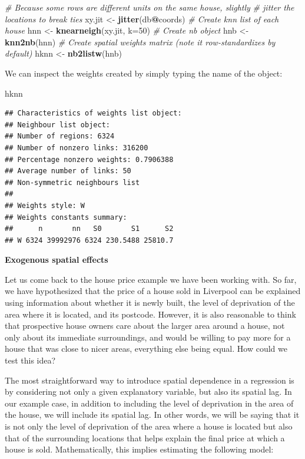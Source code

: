 \documentclass[
]{book}
\newenvironment{Shaded}{\begin{snugshade}}{\end{snugshade}}
\newcommand{\CommentTok}[1]{\textcolor[rgb]{0.56,0.35,0.01}{\textit{#1}}}
\newcommand{\DataTypeTok}[1]{\textcolor[rgb]{0.13,0.29,0.53}{#1}}
\newcommand{\DecValTok}[1]{\textcolor[rgb]{0.00,0.00,0.81}{#1}}
\newcommand{\KeywordTok}[1]{\textcolor[rgb]{0.13,0.29,0.53}{\textbf{#1}}}
\newcommand{\NormalTok}[1]{#1}
\newcommand{\OperatorTok}[1]{\textcolor[rgb]{0.81,0.36,0.00}{\textbf{#1}}}
\newcommand{\StringTok}[1]{\textcolor[rgb]{0.31,0.60,0.02}{#1}}
\begin{document}
\begin{Shaded}
\begin{Highlighting}[]
\CommentTok{# Because some rows are different units on the same house, slightly}
\CommentTok{# jitter the locations to break ties}
\NormalTok{xy.jit <-}\StringTok{ }\KeywordTok{jitter}\NormalTok{(db}\OperatorTok{@}\NormalTok{coords)}
\CommentTok{# Create knn list of each house}
\NormalTok{hnn <-}\StringTok{ }\KeywordTok{knearneigh}\NormalTok{(xy.jit, }\DataTypeTok{k=}\DecValTok{50}\NormalTok{)}
\CommentTok{# Create nb object}
\NormalTok{hnb <-}\StringTok{ }\KeywordTok{knn2nb}\NormalTok{(hnn)}
\CommentTok{# Create spatial weights matrix (note it row-standardizes by default)}
\NormalTok{hknn <-}\StringTok{ }\KeywordTok{nb2listw}\NormalTok{(hnb)}
\end{Highlighting}
\end{Shaded}

We can inspect the weights created by simply typing the name of the object:

\begin{Shaded}
\begin{Highlighting}[]
\NormalTok{hknn}
\end{Highlighting}
\end{Shaded}

\begin{verbatim}
## Characteristics of weights list object:
## Neighbour list object:
## Number of regions: 6324 
## Number of nonzero links: 316200 
## Percentage nonzero weights: 0.7906388 
## Average number of links: 50 
## Non-symmetric neighbours list
## 
## Weights style: W 
## Weights constants summary:
##      n       nn   S0       S1      S2
## W 6324 39992976 6324 230.5488 25810.7
\end{verbatim}

\textbf{Exogenous spatial effects}

Let us come back to the house price example we have been working with. So far, we have hypothesized that the price of a house sold in Liverpool can be explained using information about whether it is newly built, the level of deprivation of the area where it is located, and its postcode. However, it is also reasonable to think that prospective house owners care about the larger area around a house, not only about its immediate surroundings, and would be willing to pay more for a house that was close to nicer areas, everything else being equal. How could we test this idea?

The most straightforward way to introduce spatial dependence in a regression is by considering not only a given explanatory variable, but also its spatial lag. In our example case, in addition to including the level of deprivation in the area of the house, we will include its spatial lag. In other words, we will be saying that it is not only the level of deprivation of the area where a house is located but also that of the surrounding locations that helps explain the final price at which a house is sold. Mathematically, this implies estimating the following model:
\end{document}
